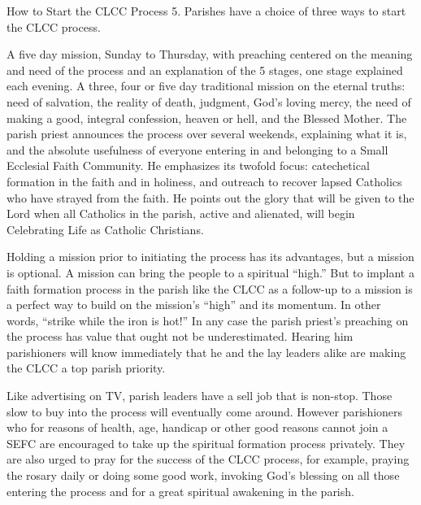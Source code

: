 \documentclass[oneside]{book}
\begin{document}
How to Start the CLCC Process
5. Parishes have a choice of three ways to start the CLCC process.

A five day mission, Sunday to Thursday, with preaching centered on the meaning
and need of the process and an explanation of the 5 stages, one stage explained
each evening.
A three, four or five day traditional mission on the eternal truths: need of
salvation, the reality of death, judgment, God's loving mercy, the need of
making a good, integral confession, heaven or hell, and the Blessed Mother.
The parish priest announces the process over several weekends, explaining what
it is, and the absolute usefulness of everyone entering in and belonging to a
Small Ecclesial Faith Community. He emphasizes its twofold focus: catechetical
formation in the faith and in holiness, and outreach to recover lapsed Catholics
who have strayed from the faith. He points out the glory that will be given to
the Lord when all Catholics in the parish, active and alienated, will begin
Celebrating Life as Catholic Christians.

Holding a mission prior to initiating the process has its advantages, but a
mission is optional. A mission can bring the people to a spiritual ``high.'' But
to implant a faith formation process in the parish like the CLCC as a follow-up
to a mission is a perfect way to build on the mission's ``high'' and its
momentum. In other words, ``strike while the iron is hot!'' In any case the
parish priest's preaching on the process has value that ought not be
underestimated. Hearing him parishioners will know immediately that he and the
lay leaders alike are making the CLCC a top parish priority.

Like advertising on TV, parish leaders have a sell job that is non-stop. Those
slow to buy into the process will eventually come around. However parishioners
who for reasons of health, age, handicap or other good reasons cannot join a
SEFC are encouraged to take up the spiritual formation process privately. They
are also urged to pray for the success of the CLCC process, for example, praying
the rosary daily or doing some good work, invoking God's blessing on all those
entering the process and for a great spiritual awakening in the parish.
\end{document}
